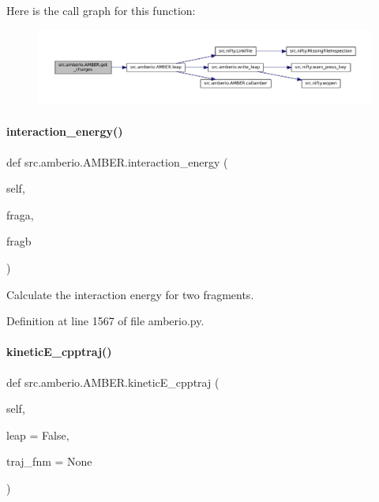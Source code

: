 Here is the call graph for this function\+:
\nopagebreak
\begin{figure}[H]
\begin{center}
\leavevmode
\includegraphics[width=350pt]{classsrc_1_1amberio_1_1AMBER_a07b9d708ccb41ff3253f253a38aa0d8f_cgraph}
\end{center}
\end{figure}
\mbox{\label{classsrc_1_1amberio_1_1AMBER_ade6dad11e3a95b62a2d708b1ac2b6456}} 
\paragraph{\texorpdfstring{interaction\+\_\+energy()}{interaction\_energy()}}
{\footnotesize\ttfamily def src.\+amberio.\+A\+M\+B\+E\+R.\+interaction\+\_\+energy (\begin{DoxyParamCaption}\item[{}]{self,  }\item[{}]{fraga,  }\item[{}]{fragb }\end{DoxyParamCaption})}



Calculate the interaction energy for two fragments. 



Definition at line 1567 of file amberio.\+py.

\mbox{\label{classsrc_1_1amberio_1_1AMBER_ad7c82d0258dc29e9326b0ee188097fca}} 
\paragraph{\texorpdfstring{kinetic\+E\+\_\+cpptraj()}{kineticE\_cpptraj()}}
{\footnotesize\ttfamily def src.\+amberio.\+A\+M\+B\+E\+R.\+kinetic\+E\+\_\+cpptraj (\begin{DoxyParamCaption}\item[{}]{self,  }\item[{}]{leap = {\ttfamily False},  }\item[{}]{traj\+\_\+fnm = {\ttfamily None} }\end{DoxyParamCaption})}



